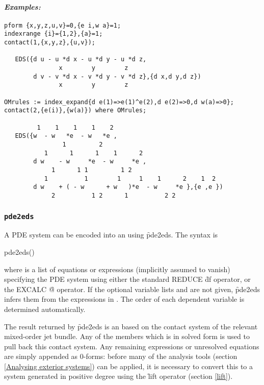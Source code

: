 \paragraph{\it Examples:}
\begin{verbatim}
pform {x,y,z,u,v}=0,{e i,w a}=1;
indexrange {i}={1,2},{a}=1;
contact(1,{x,y,z},{u,v});

   EDS({d u - u *d x - u *d y - u *d z,
               x        y        z 
        d v - v *d x - v *d y - v *d z},{d x,d y,d z})
               x        y        z 

OMrules := index_expand{d e(1)=>e(1)^e(2),d e(2)=>0,d w(a)=>0}; 
contact(2,{e(i)},{w(a)}) where OMrules;

         1    1    1    1    2
   EDS({w  - w   *e  - w   *e ,
                1         2 
           1      1      1    1      2
        d w    - w     *e  - w     *e ,
             1      1 1         1 2 
           1          1        1     1    1      2    1  2
        d w    + ( - w      + w   )*e  - w     *e },{e ,e })
             2          1 2      1          2 2 
\end{verbatim}

\subsubsection{\tt pde2eds}
\label{pde2eds}

A PDE system can be encoded into an  using \f{pde2eds}. The
syntax is
\begin{edssyntax}
	pde2eds()
\end{edssyntax}
where  is a list of equations or expressions (implicitly assumed
to vanish) specifying the PDE system using either
the standard REDUCE \f{df} operator, or the EXCALC \f{@} operator. If the
optional variable lists  and  are not
given, \f{pde2eds} infers them from the expressions in . The
order of each dependent variable is determined automatically.

The result returned by \f{pde2eds} is an  based on the contact
system of the relevant mixed-order jet bundle. Any of the 
members which is in solved form is used to pull back this contact
system. Any remaining expressions or unresolved equations are simply
appended as 0-forms: before many of the analysis tools (section
\ref{Analysing exterior systems}) can be applied, it is necessary to
convert this to a system generated in positive degree using the \f{lift}
operator (section \ref{lift}).

